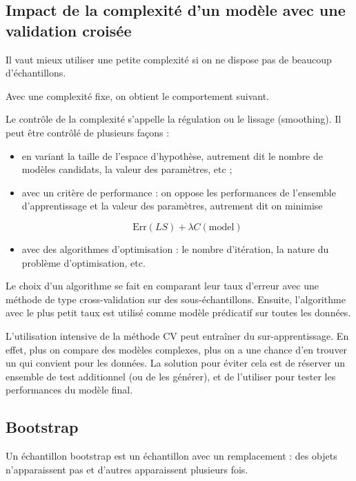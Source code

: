 	
\subsection{Impact de la complexité d'un modèle avec une validation croisée}


	Il vaut mieux utiliser une petite complexité si on ne dispose pas de beaucoup d'échantillons.

	Avec une complexité fixe, on obtient le comportement suivant.


	Le contrôle de la complexité s'appelle la régulation ou le lissage (smoothing). Il peut être contrôlé de plusieurs façons :

	\begin{itemize}
		\item en variant la taille de l'espace d'hypothèse, autrement dit le nombre de modèles candidats, la valeur des paramètres, etc ;
		\item avec un critère de performance : on oppose les performances de l'ensemble d'apprentissage et la valeur des paramètres, autrement dit on minimise
	
		$$\text{Err}(LS) + \lambda C(\text{model})$$
	
		\item avec des algorithmes d'optimisation : le nombre d'itération, la nature du problème d'optimisation, etc.
	\end{itemize}

	Le choix d'un algorithme se fait en comparant leur taux d'erreur avec une méthode de type cross-validation sur des sous-échantillons. Ensuite, l'algorithme avec le plus petit taux est utilisé comme modèle prédicatif sur toutes les données.

	L'utilisation intensive de la méthode CV peut entraîner du sur-apprentissage. En effet, plus on compare des modèles complexes, plus on a une chance d'en trouver un qui convient pour les données. La solution pour éviter cela est de réserver un ensemble de test additionnel (ou de les générer), et de l'utiliser pour tester les performances du modèle final.
	
	\subsection{Bootstrap}
	
	Un échantillon bootstrap est un échantillon avec un remplacement : des objets n'apparaissent pas et d'autres apparaissent plusieurs fois.
	
